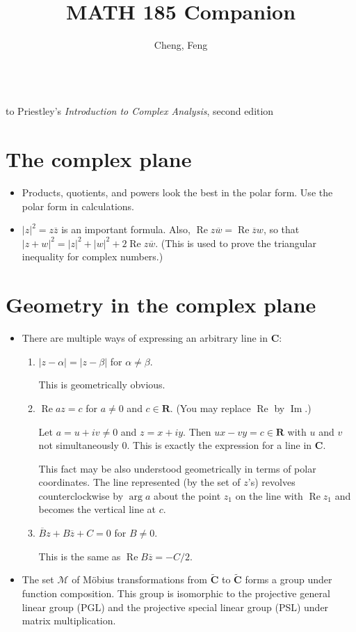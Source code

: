 \documentclass[11pt]{article}
\title{MATH 185 Companion}
\author{Cheng, Feng}
\newcommand{\R}{\mathbf{R}}
\newcommand{\C}{\mathbf{C}}
\newcommand{\eC}{\widetilde{\C}}
\renewcommand{\Re}{\operatorname{Re}}
\renewcommand{\Im}{\operatorname{Im}}
\newcommand{\conj}[1]{\overline{#1}}
\newcommand{\abs}[1]{\lvert #1 \rvert}
\begin{document}
\makeatletter
\begin{center}
    {\Large \@title}
    \\ to Priestley's \textit{Introduction to Complex Analysis}, second edition
    \vspace{0.5em}
    \\ \@author
    \vspace{-0.5em}
\end{center}
\makeatother

\section{The complex plane}
\begin{itemize}
    \item Products, quotients, and powers look the best in the polar form. Use the polar form in calculations.
    \item $\abs{z}^2 = z\conj{z}$ is an important formula. Also, $\Re z\conj{w} = \Re \conj{z} w$, so that $\abs{z+w}^2 = \abs{z}^2 + \abs{w}^2 + 2 \Re z\conj{w}$. (This is used to prove the triangular inequality for complex numbers.)
\end{itemize}

\section{Geometry in the complex plane}
\begin{itemize}
    \item There are multiple ways of expressing an arbitrary line in $\C$:
    \begin{enumerate}[label=\alph*)]
        \item $\abs{z - \alpha} = \abs{z - \beta}$ for $\alpha \neq \beta$.
        
        This is geometrically obvious.
        \item $\Re az = c$ for $a \neq 0$ and $c \in \R$. (You may replace $\Re$ by $\Im$.)
        
        Let $a = u + iv \neq 0$ and $z = x + iy$. Then $ux - vy = c \in \R$ with $u$ and $v$ not simultaneously 0. This is exactly the expression for a line in $\C$.
        
        This fact may be also understood geometrically in terms of polar coordinates. The line represented (by the set of $z$'s) revolves counterclockwise by $\arg a$ about the point $z_1$ on the line with $\Re z_1$ and becomes the vertical line at $c$.
        \item $\conj{B}z + B \conj{z} + C = 0$ for $B \neq 0$.
        
        This is the same as $ \Re B\conj{z} = -C/2$.
    \end{enumerate}
    \item The set $\mathcal{M}$ of Möbius transformations from $\eC$ to $\widetilde{\C}$ forms a group under function composition. This group is isomorphic to the projective general linear group (PGL) and the projective special linear group (PSL) under matrix multiplication.
\end{itemize}
\end{document}
